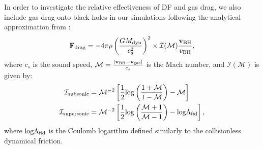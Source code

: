 In order to investigate the relative effectiveness of DF and gas drag, we also include gas drag onto black holes in our simulations following the analytical approximation from \cite{Ostriker1999}:
\begin{equation}
\label{eq:drag}
    \mathbf{F}_{\rm drag} = -4 \pi\rho \left( \frac{G M_{\rm dyn}}{c_s^2} \right)^2 \times \mathcal{I(M)}\frac{\bf{v}_{\rm BH}}{v_{\rm BH}},
\end{equation}
where $c_s$ is the sound speed, $\mathcal{M} = \frac{| \mathbf{v}_{\rm BH} - \mathbf{v}_{\rm gas}|}{c_s}$ is the Mach number, and $\mathcal{I(M)}$ is given by:
\begin{align}
    \mathcal{I}_{\rm subsonic} &= \mathcal{M}^{-2} \left[ \frac{1}{2} \text{log}\left(\frac{1+\mathcal{M}}{1-\mathcal{M}}\right) -\mathcal{M}\right] \\
    \mathcal{I}_{\rm supersonic} &= \mathcal{M}^{-2} \left[ \frac{1}{2} \text{log}\left(\frac{\mathcal{M}+1}{\mathcal{M}-1}\right) -\text{log} \Lambda_{\rm fid} \right],
\end{align}
where $\text{log} \Lambda_{\rm fid}$ is the Coulomb logarithm defined similarly to the collisionless dynamical friction.




